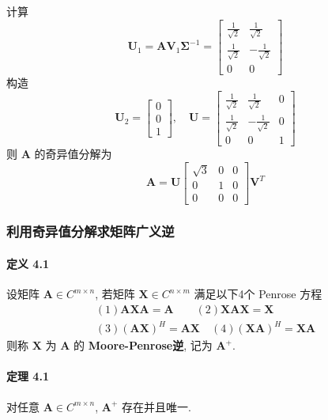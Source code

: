 计算
$$
    \bm{U}_1 = \bm{AV}_1\bm{\Sigma}^{-1} = \begin{bmatrix}
        \frac{1}{\sqrt{2}} & \frac{1}{\sqrt{2}}  \\
        \frac{1}{\sqrt{2}} & -\frac{1}{\sqrt{2}} \\
        0                  & 0
    \end{bmatrix}
$$
构造
$$
    \bm{U}_2 = \begin{bmatrix}
        0 \\
        0 \\
        1
    \end{bmatrix}, \quad
    \bm{U} = \begin{bmatrix}
        \frac{1}{\sqrt{2}} & \frac{1}{\sqrt{2}}  & 0 \\
        \frac{1}{\sqrt{2}} & -\frac{1}{\sqrt{2}} & 0 \\
        0                  & 0                   & 1
    \end{bmatrix}
$$
则 $\bm{A}$ 的奇异值分解为
$$
    \bm{A} = \bm{U}\begin{bmatrix}
        \sqrt{3} & 0 & 0 \\
        0        & 1 & 0 \\
        0        & 0 & 0
    \end{bmatrix}\bm{V}^T
$$

\subsubsection{利用奇异值分解求矩阵广义逆}

\paragraph*{定义 4.1} 设矩阵 $\bm{A} \in C^{m\times n}$, 若矩阵 $\bm{X} \in C^{n\times m}$ 满足以下4个 Penrose 方程
\begin{gather*}
    (1) \bm{AXA} = \bm{A} \quad \quad  (2) \bm{XAX} = \bm{X} \\
    (3) (\bm{AX})^H = \bm{AX} \quad (4) (\bm{XA})^H = \bm{XA}
\end{gather*}
则称 $\bm{X}$ 为 $\bm{A}$ 的 \textbf{Moore-Penrose逆}, 记为 $\bm{A}^+$.

\paragraph*{定理 4.1} 对任意 $\bm{A} \in C^{m\times n}$, $\bm{A}^+$ 存在并且唯一.

